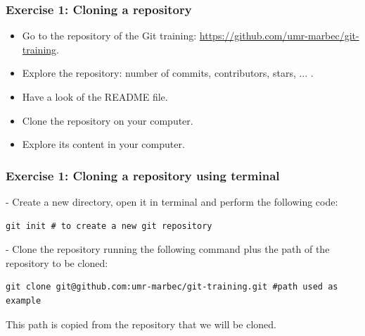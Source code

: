 \documentclass[svgnames]{beamer}
\begin{document}
% 
% 
% 

\begin{frame}
\frametitle{Exercise 1: Cloning a repository}

\begin{itemize}
    \item Go to the repository of the Git training: \url{https://github.com/umr-marbec/git-training}. 
    \item Explore the repository: number of commits, contributors, stars, ... .
    \item Have a look of the README file.
    \item Clone the repository on your computer.
    \item Explore its content in your computer.
\end{itemize}
\end{frame}


\begin{frame}[fragile]
\frametitle{Exercise 1: Cloning a repository using terminal}

- Create a new directory, open it in terminal and perform the following code:

\begin{lstlisting}
git init # to create a new git repository
\end{lstlisting}

- Clone the repository running the following command plus the path of the repository to be cloned:

\begin{lstlisting}
git clone git@github.com:umr-marbec/git-training.git #path used as example
\end{lstlisting}

This path is copied from the repository that we will be cloned.
\end{frame}
\end{document}
